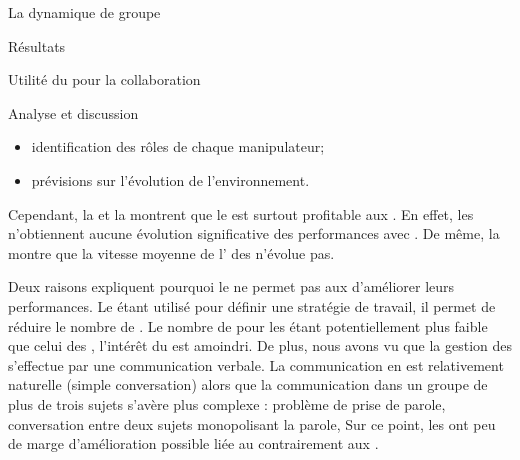 \documentclass[myfrancais,ngerman,english,french]{mythesis}
\begin{document}
\begin{mychapter}{La dynamique de groupe}
\begin{mysection}{Résultats}
\begin{mysubsection}{Utilité du \mybrainstorming pour la collaboration}
\begin{mysubsubsection}{Analyse et discussion}
\begin{itemize}
						\item identification des rôles de chaque manipulateur;
						\item prévisions sur l'évolution de l'environnement.
					\end{itemize}

					Cependant, la  et la  montrent que le \mybrainstorming est surtout profitable aux .
					En effet, les  n'obtiennent aucune évolution significative des performances avec \mybrainstorming.
					De même, la  montre que la vitesse moyenne de l' des  n'évolue pas.

					Deux raisons expliquent pourquoi le \mybrainstorming ne permet pas aux  d'améliorer leurs performances.
					Le \mybrainstorming étant utilisé pour définir une stratégie de travail, il permet de réduire le nombre de .
					Le nombre de  pour les  étant potentiellement plus faible que celui des , l'intérêt du \mybrainstorming est amoindri.
					De plus, nous avons vu que la gestion des  s'effectue par une communication verbale.
					La communication en  est relativement naturelle (simple conversation) alors que la communication dans un groupe de plus de trois sujets s'avère plus complexe : problème de prise de parole, conversation entre deux sujets monopolisant la parole, \myetc
					Sur ce point, les  ont peu de marge d'amélioration possible liée au \mybrainstorming contrairement aux .


\end{mysubsubsection}
\end{mysubsection}
\end{mysection}
\end{mychapter}
\end{document}
